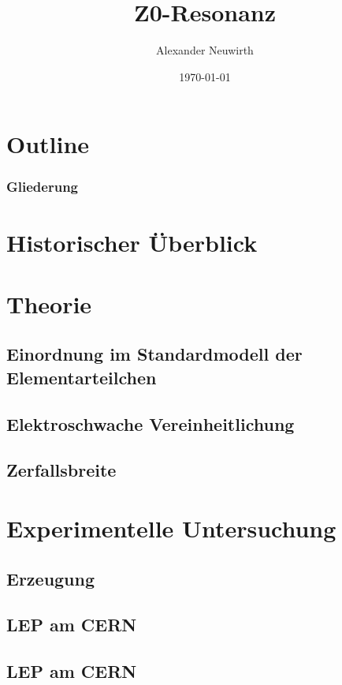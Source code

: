 \documentclass[german, ngerman]{beamer}
\title[Z0 Resonanz]{Z0-Resonanz} %
\author{Alexander Neuwirth}
\date{\today}
\begin{document}
\begin{frame}
	\titlepage
\end{frame}

\section*{Outline}
\begin{frame}
\frametitle{Gliederung}
\tableofcontents[hideallsubsections]
\end{frame}


\section{Historischer Überblick}


\section{Theorie}
\subsection{Einordnung im Standardmodell der Elementarteilchen}
\subsection{Elektroschwache Vereinheitlichung}
\subsection{Zerfallsbreite}
\section{Experimentelle Untersuchung}
\subsection{Erzeugung}
\subsection{LEP am CERN}
\subsection{LEP am CERN}
\end{document}
